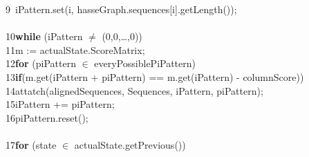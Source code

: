 \documentclass[a4paper,10pt]{thesis}
\begin{document}
{{{{        9\ \hspace*{2em}\hspace*{2em}\hspace*{2em}\hspace*{2em}iPattern.set(i, hasseGraph.sequences[i].getLength());\\\\
        10\hspace*{2em}\hspace*{2em}\textbf{while} (iPattern $\neq$ (0,0,\dots,0))\\
        11\hspace*{2em}\hspace*{2em}\hspace*{2em}m := actualState.ScoreMatrix;\\
        12\hspace*{2em}\hspace*{2em}\hspace*{2em}\textbf{for} (piPattern $\in$ everyPossiblePiPattern)\\
        13\hspace*{2em}\hspace*{2em}\hspace*{2em}\hspace*{2em}\textbf{if}(m.get(iPattern + piPattern) == m.get(iPattern) - columnScore))\\
        14\hspace*{2em}\hspace*{2em}\hspace*{2em}\hspace*{2em}\hspace*{2em}attatch(alignedSequences, Sequences, iPattern, piPattern);\\
        15\hspace*{2em}\hspace*{2em}\hspace*{2em}\hspace*{2em}\hspace*{2em}iPattern += piPattern;\\
        16\hspace*{2em}\hspace*{2em}\hspace*{2em}\hspace*{2em}\hspace*{2em}piPattern.reset();\\\\
        17\hspace*{2em}\hspace*{2em}\hspace*{2em}\textbf{for} (state $\in$ actualState.getPrevious())\\
}}}}
\end{document}
